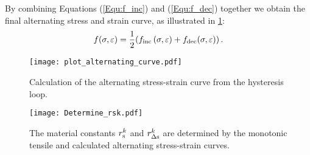 By combining Equations (\ref{Equ:f_inc}) and (\ref{Equ:f_dec}) together we obtain the final alternating stress and strain curve, as illustrated in \ref{Fig:Alternating_Curve}:
\begin{equation}
f(\sigma,\varepsilon)=\frac{1}{2}(f_{\rm{inc}}\left(\sigma,\varepsilon)+f_{\rm{dec}}(\sigma,\varepsilon)\right).
\end{equation}
\begin{figure}[!htp]
\centering
  \texttt{[image: plot\_alternating\_curve.pdf]}
  \caption{Calculation of the alternating stress-strain curve from the hysteresis loop.}
  \label{Fig:Alternating_Curve}
\end{figure}
\begin{figure}[!htp]
\centering
\texttt{[image: Determine\_rsk.pdf]}
\caption{The material constants $r_{\rm{s}}^k$ and $r_{\Delta \rm{s}}^k$ are determined by the monotonic tensile and calculated alternating stress-strain curves.}
\label{Fig:Determine_rsk}
\end{figure}

